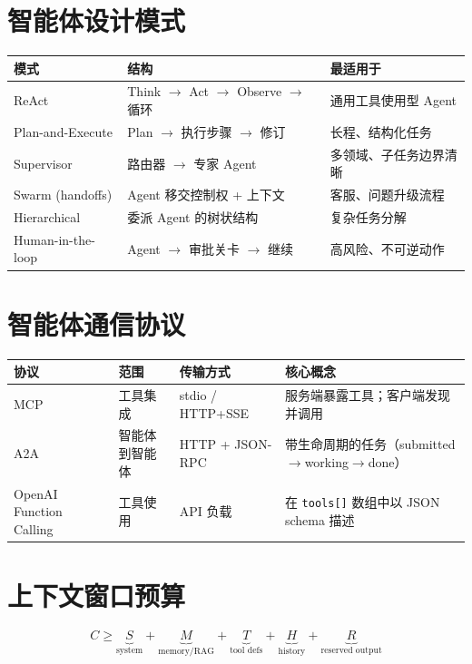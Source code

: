 \section{智能体设计模式}
\label{agentic-design-patterns}

\begin{center}
\begin{tabularx}{0.88\linewidth}{@{}l Z{1.07} Z{0.93}@{}}
\toprule
\textbf{模式} & \textbf{结构} & \textbf{最适用于} \\
\midrule
ReAct & Think $\to$ Act $\to$ Observe $\to$ 循环 & 通用工具使用型 Agent \\
Plan-and-Execute & Plan $\to$ 执行步骤 $\to$ 修订 & 长程、结构化任务 \\
Supervisor & 路由器 $\to$ 专家 Agent & 多领域、子任务边界清晰 \\
Swarm (handoffs) & Agent 移交控制权 + 上下文 & 客服、问题升级流程 \\
Hierarchical & 委派 Agent 的树状结构 & 复杂任务分解 \\
Human-in-the-loop & Agent $\to$ 审批关卡 $\to$ 继续 & 高风险、不可逆动作 \\
\bottomrule
\end{tabularx}
\end{center}

\section{智能体通信协议}
\label{agent-communication-protocols}

\noindent\begin{tabularx}{\linewidth}{@{}l Z{0.42} Z{0.75} Z{1.83}@{}}
\toprule
\textbf{协议} & \textbf{范围} & \textbf{传输方式} & \textbf{核心概念} \\
\midrule
MCP & 工具集成 & stdio / HTTP+SSE & 服务端暴露工具；客户端发现并调用 \\
A2A & 智能体到智能体 & HTTP + JSON-RPC & 带生命周期的任务（submitted$\to$working$\to$done） \\
OpenAI Function Calling & 工具使用 & API 负载 & 在 \texttt{tools[]} 数组中以 JSON schema 描述 \\
\bottomrule
\end{tabularx}

\section{上下文窗口预算}
\label{context-window-budget}

\begin{equation}
C \geq \underbrace{S}_{\text{system}} + \underbrace{M}_{\text{memory/RAG}} + \underbrace{T}_{\text{tool defs}} + \underbrace{H}_{\text{history}} + \underbrace{R}_{\text{reserved output}}
\end{equation}


